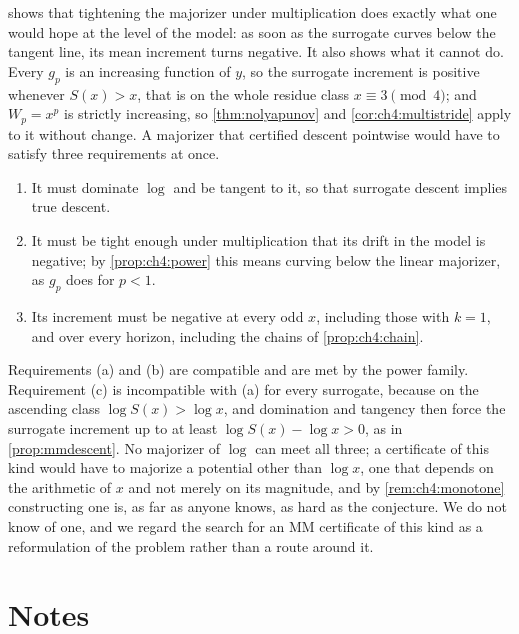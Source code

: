  shows that tightening the majorizer under
multiplication does exactly what one would hope at the level of the model: as
soon as the surrogate curves below the tangent line, its mean increment turns
negative.  It also shows what it cannot do.  Every $g_p$ is an increasing
function of $y$, so the surrogate increment is positive whenever $S(x)>x$,
that is on the whole residue class $x\equiv3\pmod4$; and $W_p=x^{p}$ is
strictly increasing, so \cref{thm:nolyapunov} and \cref{cor:ch4:multistride}
apply to it without change.  A majorizer that certified descent pointwise
would have to satisfy three requirements at once.
\begin{enumerate}[label=(\alph*)]
\item It must dominate $\log$ and be tangent to it, so that surrogate descent
  implies true descent.
\item It must be tight enough under multiplication that its drift in the
  model is negative; by \cref{prop:ch4:power} this means curving below the
  linear majorizer, as $g_p$ does for $p<1$.
\item Its increment must be negative at every odd $x$, including those with
  $k=1$, and over every horizon, including the chains of
  \cref{prop:ch4:chain}.
\end{enumerate}
Requirements (a) and (b) are compatible and are met by the power family.
Requirement (c) is incompatible with (a) for every surrogate, because on the
ascending class $\log S(x)>\log x$, and domination and tangency then force the
surrogate increment up to at least $\log S(x)-\log x>0$, as in
\cref{prop:mmdescent}.  No majorizer of $\log$ can meet all three; a certificate
of this kind would have to majorize a potential other than $\log x$, one that
depends on the arithmetic of $x$ and not merely on its magnitude, and by
\cref{rem:ch4:monotone} constructing one is, as far as anyone
knows, as hard as the conjecture.  We do not know of one, and we regard the
search for an MM certificate of this kind as a reformulation of the problem
rather than a route around it.

\section*{Notes}

